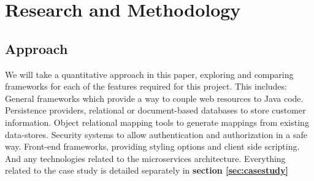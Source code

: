 \documentclass[12pt]{article}
\begin{document}
\section{Research and Methodology}
\begin{multicols}{2}
\subsection{Approach}
We will take a quantitative approach in this paper, exploring and comparing frameworks for each of the features required for this project. This includes: General frameworks which provide a way to couple web resources to Java code. Persistence providers, relational or document-based databases to store customer information. Object relational mapping tools to generate mappings from existing data-stores. Security systems to allow authentication and authorization in a safe way. Front-end frameworks, providing styling options and client side scripting. And any technologies related to the microservices architecture. Everything related to the case study is detailed separately in \textbf{section \ref{sec:casestudy}}


\end{multicols}
\end{document}
